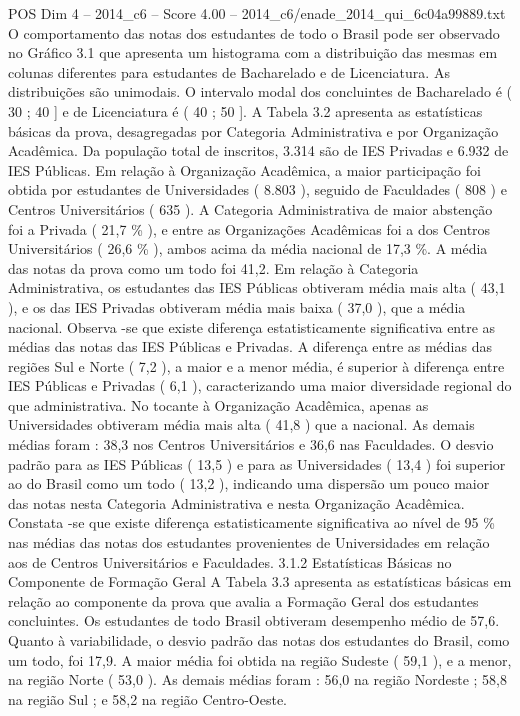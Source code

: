 \begin{textsample}{POS Dim 4 – 2014\_c6 – Score 4.00 – 2014\_c6/enade\_2014\_qui\_6c04a99889.txt}
O comportamento das notas dos estudantes de todo o Brasil pode ser observado no Gráfico 3.1 que apresenta um histograma com a distribuição das mesmas em colunas diferentes para estudantes de Bacharelado e de Licenciatura.
As distribuições são unimodais.
O intervalo modal dos concluintes de Bacharelado é ( 30 ; 40 ] e de Licenciatura é ( 40 ; 50 ].
A Tabela 3.2 apresenta as estatísticas básicas da prova, desagregadas por Categoria Administrativa e por Organização Acadêmica.
Da população total de inscritos, 3.314 são de IES Privadas e 6.932 de IES Públicas.
Em relação à Organização Acadêmica, a maior participação foi obtida por estudantes de Universidades ( 8.803 ), seguido de Faculdades ( 808 ) e Centros Universitários ( 635 ).
A Categoria Administrativa de maior abstenção foi a Privada ( 21,7 \% ), e entre as Organizações Acadêmicas foi a dos Centros Universitários ( 26,6 \% ), ambos acima da média nacional de 17,3 \%.
A média das notas da prova como um todo foi 41,2.
Em relação à Categoria Administrativa, os estudantes das IES Públicas obtiveram média mais alta ( 43,1 ), e os das IES Privadas obtiveram média mais baixa ( 37,0 ), que a média nacional.
Observa -se que existe diferença estatisticamente significativa entre as médias das notas das IES Públicas e Privadas.
A diferença entre as médias das regiões Sul e Norte ( 7,2 ), a maior e a menor média, é superior à diferença entre IES Públicas e Privadas ( 6,1 ), caracterizando uma maior diversidade regional do que administrativa.
No tocante à Organização Acadêmica, apenas as Universidades obtiveram média mais alta ( 41,8 ) que a nacional.
As demais médias foram : 38,3 nos Centros Universitários e 36,6 nas Faculdades.
O desvio padrão para as IES Públicas ( 13,5 ) e para as Universidades ( 13,4 ) foi superior ao do Brasil como um todo ( 13,2 ), indicando uma dispersão um pouco maior das notas nesta Categoria Administrativa e nesta Organização Acadêmica.
Constata -se que existe diferença estatisticamente significativa ao nível de 95 \% nas médias das notas dos estudantes provenientes de Universidades em relação aos de Centros Universitários e Faculdades. 3.1.2 Estatísticas Básicas no Componente de Formação Geral A Tabela 3.3 apresenta as estatísticas básicas em relação ao componente da prova que avalia a Formação Geral dos estudantes concluintes.
Os estudantes de todo Brasil obtiveram desempenho médio de 57,6.
Quanto à variabilidade, o desvio padrão das notas dos estudantes do Brasil, como um todo, foi 17,9.
A maior média foi obtida na região Sudeste ( 59,1 ), e a menor, na região Norte ( 53,0 ).
As demais médias foram : 56,0 na região Nordeste ; 58,8 na região Sul ; e 58,2 na região Centro-Oeste.

\end{textsample}

